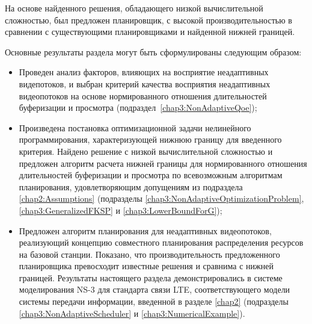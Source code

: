 На основе найденного решения, обладающего низкой вычислительной сложностью, был предложен планировщик, с высокой производительностью в сравнении с существующими планировщиками и найденной нижней границей.

Основные результаты раздела могут быть сформулированы следующим образом:
\begin{itemize}
	\item Проведен анализ факторов, влияющих на восприятие неадаптивных видепотоков, и выбран критерий качества восприятия неадаптивных видеопотоков на основе нормированного отношения длительностей буферизации и просмотра (подраздел~\ref{chap3:NonAdaptiveQoe});
	\item Произведена постановка оптимизационной задачи нелинейного программирования, характеризующей нижнюю границу для введенного критерия. Найдено решение с низкой вычислительной сложностью и предложен алгоритм расчета нижней границы для нормированного отношения длительностей буферизации и просмотра по всевозможным алгоритмам планирования, удовлетворяющим допущениям из подраздела \ref{chap2:Assumptions} (подразделы \ref{chap3:NonAdaptiveOptimizationProblem}, \ref{chap3:GeneralizedFKSP} и \ref{chap3:LowerBoundForG});
	\item Предложен алгоритм планирования для неадаптивных видеопотоков, реализующий концепцию совместного планирования распределения ресурсов на базовой станции. Показано, что производительность предложенного планировщика превосходит известные решения и сравнима с нижней границей. Результаты настоящего раздела демонстрировались в системе моделирования NS-3 для стандарта связи LTE, соответствующего модели системы передачи информации, введенной в разделе \ref{chap2} (подразделы \ref{chap3:NonAdaptiveScheduler} и \ref{chap3:NumericalExample}).
\end{itemize}
